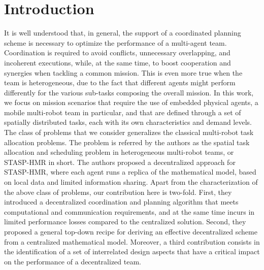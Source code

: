 \documentclass[conference]{IEEEtran}
\begin{document}




%
\IEEEpeerreviewmaketitle



\section{Introduction}
It is well understood that, in general, the support of a coordinated planning scheme is necessary to optimize the performance of a multi-agent team\cite{feo2016decentralized}. Coordination is required to avoid conflicts, unnecessary overlapping, and incoherent executions, while, at the same time, to boost cooperation and synergies when tackling a common mission. This is even more true when the team is heterogeneous, due to the fact that different agents might perform differently for the various sub-tasks composing the overall mission. In this work, we focus on mission scenarios that require the use of embedded physical agents, a mobile multi-robot team in particular, and that are defined through a set of spatially distributed tasks, each with its own characteristics and demand levels. The class of problems that we consider generalizes the classical multi-robot task allocation problems. The problem is referred by the authors as the spatial task allocation and scheduling problem in heterogeneous multi-robot teams, or STASP-HMR in short. The authors proposed a decentralized approach for STASP-HMR, where each agent runs a replica of the mathematical model, based on local data and limited information sharing. Apart from the characterization of the above class of problems, our contribution here is two-fold. First, they introduced a decentralized coordination and planning algorithm that meets computational and communication requirements, and at the same time incurs in limited performance losses compared to the centralized solution. Second, they proposed a general top-down recipe for deriving an effective decentralized scheme from a centralized mathematical model. Moreover, a third contribution consists in the identification of a set of interrelated design aspects that have a critical impact on the performance of a decentralized team.
\end{document}
